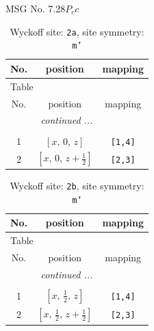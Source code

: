 \documentclass[fleqn,8pt]{jsarticle}
\begin{document}
\setcounter{MaxMatrixCols}{32}

\renewcommand{\tablename}{Table~}
\renewcommand{\figurename}{Figure~}
\begin{center}
\LARGE
MSG No. 7.28\quad$P_{c}c$
\end{center}
\renewcommand{\arraystretch}{1.2}
\begin{longtable}{ccc}
\caption{Wyckoff site: {\tt 2a}, site symmetry: {\tt m'}}
 \\
 \hline \hline
No. & position & mapping \\ \hline \endfirsthead

\multicolumn{2}{l}{\tablename\ \thetable{}} \\
 \hline \hline
No. & position & mapping \\ \hline \endhead

 \hline \hline
\multicolumn{2}{r}{\footnotesize\it continued ...} \\ \endfoot

 \hline \hline
\multicolumn{2}{r}{} \\ \endlastfoot

1 & $\left[ x,\, 0,\, z \right]$ & {\tt [1,4]} \\ \hline
2 & $\left[ x,\, 0,\, z + \frac{1}{2} \right]$ & {\tt [2,3]} \\
\end{longtable}
\renewcommand{\arraystretch}{1.2}
\begin{longtable}{ccc}
\caption{Wyckoff site: {\tt 2b}, site symmetry: {\tt m'}}
 \\
 \hline \hline
No. & position & mapping \\ \hline \endfirsthead

\multicolumn{2}{l}{\tablename\ \thetable{}} \\
 \hline \hline
No. & position & mapping \\ \hline \endhead

 \hline \hline
\multicolumn{2}{r}{\footnotesize\it continued ...} \\ \endfoot

 \hline \hline
\multicolumn{2}{r}{} \\ \endlastfoot

1 & $\left[ x,\, \frac{1}{2},\, z \right]$ & {\tt [1,4]} \\ \hline
2 & $\left[ x,\, \frac{1}{2},\, z + \frac{1}{2} \right]$ & {\tt [2,3]} \\
\end{longtable}
\renewcommand{\arraystretch}{1.2}
\end{document}
